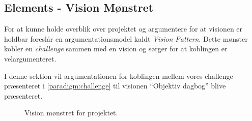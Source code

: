 \subsection{Elements - Vision Mønstret}
For at kunne holde overblik over projektet og argumentere for at visionen er holdbar foreslår \citet[Kapitel 15 - Project]{art:essence} en argumentationsmodel kaldt \emph{Vision Pattern}. 
Dette mønster kobler en \emph{challenge} sammen med en vision og sørger for at koblingen er velargumenteret.

I denne sektion vil argumentationen for koblingen mellem vores challenge præsenteret i \cref{paradigm:challenge} til visionen ``Objektiv dagbog'' blive præsenteret.

\begin{figure}[h]
	\centering
	\resizebox{\columnwidth}{!}{
	}
	\caption{Vision mønstret for projektet.}
	\label{fig:visionpattern}
\end{figure}
